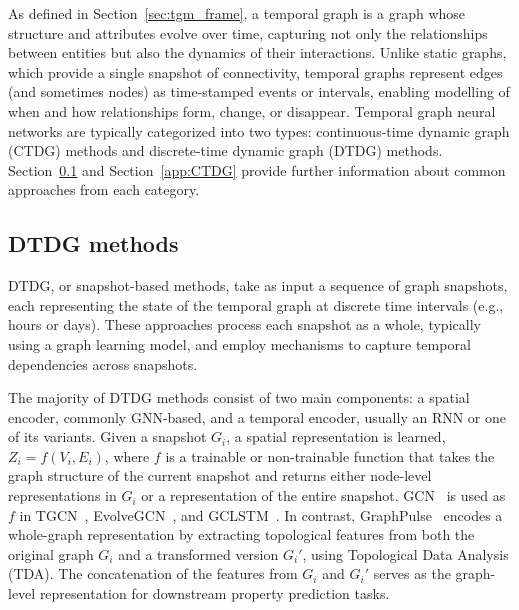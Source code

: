 As defined in Section~\ref{sec:tgm_frame}, a temporal graph is a graph whose structure and attributes evolve over time, capturing not only the relationships between entities but also the dynamics of their interactions. Unlike static graphs, which provide a single snapshot of connectivity, temporal graphs represent edges (and sometimes nodes) as time-stamped events or intervals, enabling modelling of when and how relationships form, change, or disappear. Temporal graph neural networks are typically categorized into two types: continuous-time dynamic graph (CTDG) methods and discrete-time dynamic graph (DTDG) methods. Section~\ref{app:DTDG} and Section~\ref{app:CTDG} provide further information about common approaches from each category.




\subsection{DTDG methods} \label{app:DTDG}

DTDG, or snapshot-based methods, take as input a sequence of graph snapshots, each representing the state of the temporal graph at discrete time intervals (e.g., hours or days). These approaches process each snapshot as a whole, typically using a graph learning model, and employ mechanisms to capture temporal dependencies across snapshots.

The majority of DTDG methods consist of two main components: a spatial encoder, commonly GNN-based, and a temporal encoder, usually an RNN or one of its variants. Given a snapshot $G_i$, a spatial representation is learned, $Z_i = f(V_i, E_i)$, where $f$ is a trainable or non-trainable function that takes the graph structure of the current snapshot and returns either node-level representations in $G_i$ or a representation of the entire snapshot. GCN~\citep{gcn} is used as $f$ in TGCN~\citep{t-gcn}, EvolveGCN~\citep{DBLP:conf/aaai/ParejaDCMSKKSL20}, and GCLSTM~\citep{gclstm}. In contrast, GraphPulse~\citep{DBLP:conf/iclr/ShamsiPHNCA24} encodes a whole-graph representation by extracting topological features from both the original graph $G_i$ and a transformed version $G_i'$, using Topological Data Analysis (TDA). The concatenation of the features from $G_i$ and $G_i'$ serves as the graph-level representation for downstream property prediction tasks.

